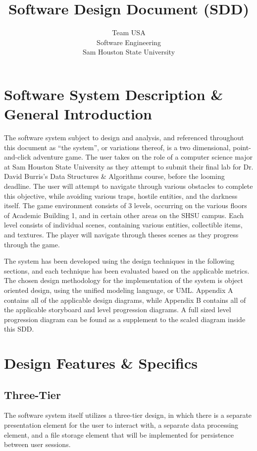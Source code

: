 \documentclass{article}
\title{Software Design Document (SDD)}
\author{Team USA \\ Software Engineering \\ Sam Houston State University}
\begin{document}
\maketitle
\newpage

\tableofcontents
\newpage

%
%
\section{Software System Description \& General Introduction}
The software system subject to design and analysis, and referenced throughout this document as ``the system'', or variations thereof, is a two dimensional, point-and-click adventure game. The user takes on the role of a computer science major at Sam Houston State University as they attempt to submit their final lab for Dr. David Burris's Data Structures \& Algorithms course, before the looming deadline. The user will attempt to navigate through various obstacles to complete this objective, while avoiding various traps, hostile entities, and the darkness itself. The game environment consists of 3 levels, occurring on the various floors of Academic Building 1, and in certain other areas on the SHSU campus. Each level consists of individual scenes, containing various entities, collectible items, and textures. The player will navigate through theses scenes as they progress through the game. 

The system has been developed using the design techniques in the following sections, and each technique has been evaluated based on the applicable metrics. The chosen design methodology for the implementation of the system is object oriented design, using the unified modeling language, or UML. Appendix A contains all of the applicable design diagrams, while Appendix B contains all of the applicable storyboard and level progression diagrams. A full sized level progression diagram can be found as a supplement to the scaled diagram inside this SDD. 
%
%
\section{Design Features \& Specifics}
	\subsection{Three-Tier}
		The software system itself utilizes a three-tier design, in which there is a separate presentation element for the user to interact with, a separate data processing element, and a file storage element that will be implemented for persistence between user sessions. 
\end{document}
